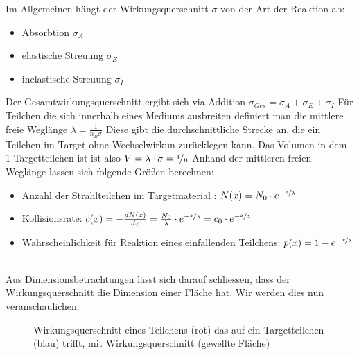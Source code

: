 \documentclass[Ex4_Zusammenfassung.tex]{subfiles}
\begin{document}
Im Allgemeinen hängt der Wirkungsquerschnitt  $ \sigma $ von der Art der Reaktion ab: 
\begin{itemize}
\item Absorbtion $ \sigma_{A} $
\item elastische Streuung $ \sigma_{E} $
\item inelastische Streuung $ \sigma_{I} $
\end{itemize}
Der Gesamtwirkungsquerschnitt ergibt sich via Addition $ \sigma_{Ges} = \sigma_{A} + \sigma_{E} + \sigma_{I}  $ \newline
Für Teilchen die sich innerhalb eines Mediums ausbreiten definiert man die mittlere freie Weglänge $ \lambda = \frac{1}{n_B \sigma}$ \newline
Diese gibt die durchschnittliche Strecke an, die ein Teilchen im Target ohne Wechselwirkun zurücklegen kann. \newpage
Das Volumen in dem 1 Targetteilchen ist ist also $ V = \lambda \cdot \sigma = \nicefrac{1}{n} $  \newline
Anhand der mittleren freien Weglänge lassen sich folgende Größen berechnen: 
\begin{itemize}
\item Anzahl der Strahlteilchen im Targetmaterial : $ N(x) = N_{0} \cdot e^{-\nicefrac{x}{\lambda}} $
\item Kollisionsrate: $ c(x) = - \frac{dN(x)}{dx} = \frac{N_{0}}{\lambda} \cdot e^{-\nicefrac{x}{\lambda}} = c_0 \cdot e^{-\nicefrac{x}{\lambda}} $
\item Wahrscheinlichkeit für Reaktion eines einfallenden Teilchens: $  p(x) = 1- e^{-\nicefrac{x}{\lambda}} $
\end{itemize}
\ \\ 
Aus Dimensionsbetrachtungen lässt sich darauf schliessen, dass der Wirkungsquerschnitt die Dimension einer Fläche hat. Wir werden dies nun veranschaulichen: 
\begin{figure}[h]
\centering
{}
\caption{Wirkungsquerschnitt eines Teilchens (rot) das auf ein Targetteilchen (blau) trifft, mit Wirkungsquerschnitt (gewellte Fläche)}
\end{figure} \newline
\end{document}
